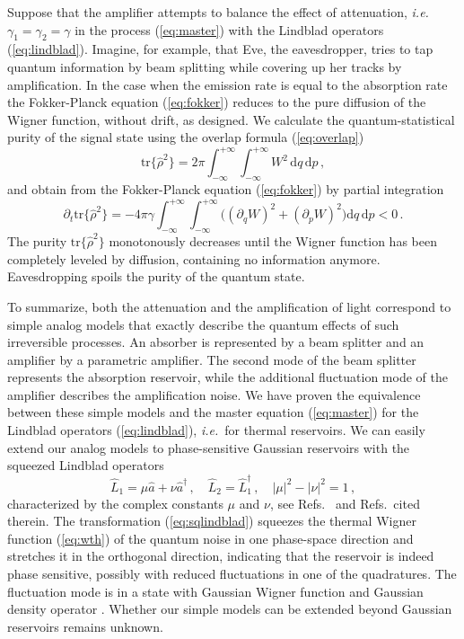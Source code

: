 \documentclass[12pt,amsmath,amssymb]{article}
\numberwithin{equation}{section}
\begin{document}
Suppose that the amplifier attempts to balance the effect of
attenuation, {\it i.e.}\ $\gamma_1=\gamma_2=\gamma$ in the process
(\ref{eq:master}) with the Lindblad operators
(\ref{eq:lindblad}). Imagine, for example, that Eve, the eavesdropper,
tries to tap quantum information by beam splitting while covering
up her tracks by amplification. In the case when the emission
rate is equal to the absorption rate the Fokker-Planck equation
(\ref{eq:fokker}) reduces to the pure diffusion of the Wigner
function, without drift, as designed. We calculate the
quantum-statistical purity \cite{Gardiner,Leonhardt} of the signal
state using the overlap formula (\ref{eq:overlap})
\begin{equation}
\mathrm{tr}\{\hat{\rho}^2\} = 2\pi \int_{-\infty}^{+\infty}
\int_{-\infty}^{+\infty} W^2\, \mathrm{d}q\,\mathrm{d}p \,,
\end{equation}
and obtain from the Fokker-Planck equation (\ref{eq:fokker}) by
partial integration
\begin{equation}
\partial_t \mathrm{tr}\{\hat{\rho}^2\} = -4\pi\gamma
\int_{-\infty}^{+\infty}\int_{-\infty}^{+\infty}
\Big((\partial_qW)^2+(\partial_pW)^2\Big)
\mathrm{d}q\,\mathrm{d}p
< 0 \,.
\end{equation}
The purity $\mathrm{tr}\{\hat{\rho}^2\}$ monotonously decreases
until the Wigner function has been completely leveled by
diffusion, containing no information anymore. Eavesdropping
spoils the purity of the quantum state.

To summarize,
both the attenuation and the amplification of light correspond to
simple analog models that exactly describe the quantum effects of
such irreversible processes. An absorber is represented by a beam
splitter and an amplifier by a parametric amplifier. The second
mode of the beam splitter represents the absorption reservoir,
while the additional fluctuation mode of the amplifier describes
the amplification noise. We have proven \cite{LeoSU2,LeoSU11} the
equivalence between these simple models and the master equation
(\ref{eq:master}) for the Lindblad operators (\ref{eq:lindblad}),
{\it i.e.}\ for thermal reservoirs. We can easily extend
\cite{LeoSU2,LeoSU11} our analog models to phase-sensitive
Gaussian reservoirs \cite{Gardiner} with the
squeezed Lindblad operators
\begin{equation}
\label{eq:sqlindblad} \hat{L}_1 = \mu\hat{a}+\nu\hat{a}^\dagger
\,,\quad \hat{L}_2 = \hat{L}_1^\dagger \,,\quad |\mu|^2-|\nu|^2=1
\,,
\end{equation}
characterized by the complex constants $\mu$ and $\nu$,
see Refs.\ \cite{LeoSU2,LeoSU11} and Refs.\ cited therein.
The transformation (\ref{eq:sqlindblad}) squeezes the thermal Wigner
function (\ref{eq:wth}) of the quantum noise in one phase-space
direction and stretches it in the orthogonal direction,
indicating that the reservoir is indeed phase sensitive, possibly
with reduced fluctuations in one of the quadratures. The
fluctuation mode is in a state with Gaussian Wigner function and
Gaussian density operator \cite{Gardiner}. Whether our simple
models can be extended beyond Gaussian reservoirs remains unknown.
\end{document}
